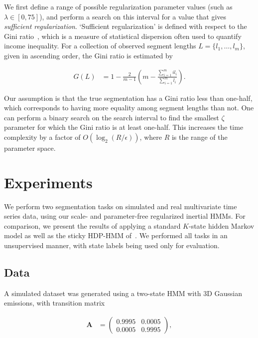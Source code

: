 \documentclass[letterpaper]{article}
\begin{document}
We first define a range of possible regularization parameter values (such as
$\lambda \in [0, 75]$), and perform a search on this interval for a value that
gives \emph{sufficient regularization}. `Sufficient regularization' is defined
with respect to the Gini ratio~\cite{gini1936,wiki:1}, which is a measure of
statistical dispersion often used to quantify income inequality. For a
collection of observed segment lengths $L = \{l_1, \ldots, l_m\}$, given in
ascending order, the Gini ratio is estimated by

\vspace{-0.5cm}
\begin{align*}
    G(L) &= 1 - \frac{2}{m-1}\left(m - \frac{\sum_{i=1}^{m} i l_i}{\sum_{i=1}^{m} l_i}\right).
\end{align*}
\vspace{-0.1cm}

Our assumption is that the true segmentation has a Gini ratio less than
one-half, which corresponds to having more equality among segment lengths than
not. One can perform a binary search on the search interval to find the smallest
$\zeta$ parameter for which the Gini ratio is at least one-half. This increases
the time complexity by a factor of $O(\log_2 (R / \epsilon))$, where $R$ is the
range of the parameter space.
\vspace{-0.2cm}
\section{Experiments}\label{sec:Experiments}
\vspace{-0.1cm}
We perform two segmentation tasks on simulated and real multivariate time series
data, using our scale- and parameter-free regularized inertial HMMs. For
comparison, we present the results of applying a standard $K$-state hidden
Markov model as well as the sticky HDP-HMM of~\cite{fox2011sticky}. We
performed all tasks in an unsupervised manner, with state labels being used only
for evaluation.
\vspace{-0.1cm}
\subsection{Data}\label{sec:datasets}
\vspace{-0.1cm}
A simulated dataset was generated using a two-state HMM with 3D Gaussian emissions, with transition matrix

\vspace{-0.5cm}
\begin{align*}
    \mathbf{A} &= \left( 
                   \begin{array}{ccc}
                    0.9995 & 0.0005 \\
                    0.0005 & 0.9995
                   \end{array}
                   \right),
\end{align*}
\vspace{-0.1cm}
\end{document}
